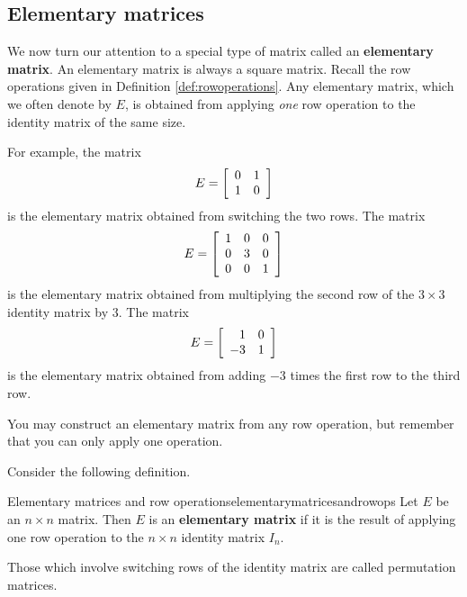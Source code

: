 
\subsection{Elementary matrices}

We now turn our attention to a special type of matrix called an \textbf{elementary matrix}. 
An elementary matrix is always a square matrix. Recall the row operations given in Definition \ref{def:rowoperations}.
Any elementary matrix, which we often denote by $E$, is obtained from applying
{\em one\em} row operation to the identity matrix of the same size. 

For example, the matrix
\begin{equation*}
E = 
\left[
\begin{array}{rr}
0 & 1 \\
1 & 0
\end{array}
\right]
\end{equation*}
is the elementary matrix obtained from switching the two rows. 
The matrix 
\begin{equation*}
E = 
\left[
\begin{array}{rrr}
1 & 0 & 0 \\
0 & 3 & 0 \\
0 & 0 & 1
\end{array}
\right]
\end{equation*}
is the elementary matrix obtained from multiplying the second row of the $3 \times 3$ identity matrix
by $3$.
The matrix
\begin{equation*}
E = 
\left[
\begin{array}{rr}
1 & 0 \\
-3 & 1
\end{array}
\right]
\end{equation*}
is the elementary matrix obtained from adding $-3$ times the first row to the third row.

You may construct an elementary matrix from any row operation, but remember that you can only apply one operation.

Consider the following definition. 

\begin{definition}{Elementary matrices and row operations}{elementarymatricesandrowops}
Let $E$ be an $n \times n$ matrix. Then $E$ is an \textbf{elementary matrix} 
if it is the result of applying one row operation to the $n \times n$ identity matrix $I_n$. 

Those which involve switching rows of the identity matrix are called
permutation matrices.
\end{definition}

